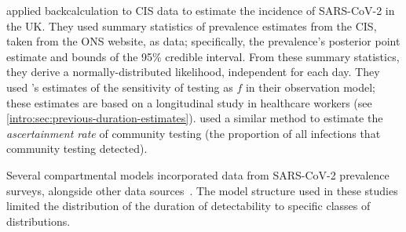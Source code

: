 \documentclass[thesis.tex]{subfiles}
\begin{document}
\Textcite{abbottCISincidence} applied backcalculation to CIS data to estimate the incidence of SARS-CoV-2 in the UK.
They used summary statistics of prevalence estimates from the CIS, taken from the ONS website, as data; specifically, the prevalence's posterior point estimate and bounds of the 95\% credible interval.
From these summary statistics, they derive a normally-distributed likelihood, independent for each day.
They used \textcite{hellewellPCRSensitivity}'s estimates of the sensitivity of testing as $f$ in their observation model; these estimates are based on a longitudinal study in healthcare workers (see \cref{intro:sec:previous-duration-estimates}).
\Textcite{colmanAscertainment} used a similar method to estimate the \emph{ascertainment rate} of community testing (the proportion of all infections that community testing detected).

Several compartmental models incorporated data from SARS-CoV-2 prevalence surveys, alongside other data sources~\autocite{daviesAssociation,ironsEstimating,knockKey,nicholsonImproving,pooleyEstimation,birrellRTM2}.
The model structure used in these studies limited the distribution of the duration of detectability to specific classes of distributions.
\end{document}
